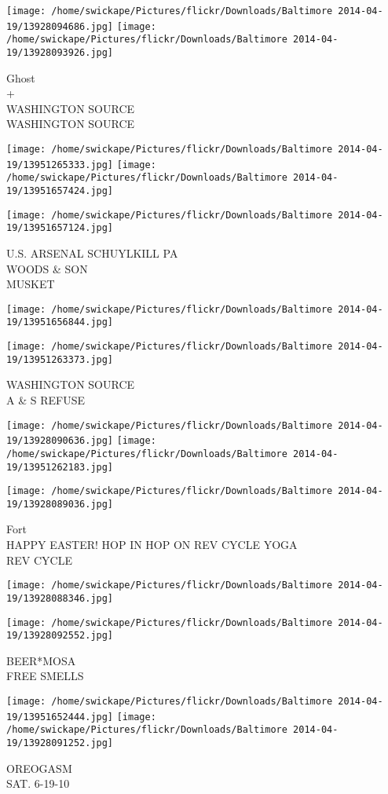 \documentclass[10pt,letterpaper]{article}
\begin{document}
\texttt{[image: /home/swickape/Pictures/flickr/Downloads/Baltimore 2014-04-19/13928094686.jpg]}
\texttt{[image: /home/swickape/Pictures/flickr/Downloads/Baltimore 2014-04-19/13928093926.jpg]}

Ghost\\
+\\
WASHINGTON SOURCE\\
WASHINGTON SOURCE
\pagebreak

\texttt{[image: /home/swickape/Pictures/flickr/Downloads/Baltimore 2014-04-19/13951265333.jpg]}
\texttt{[image: /home/swickape/Pictures/flickr/Downloads/Baltimore 2014-04-19/13951657424.jpg]}

\vspace{0.25in}
\texttt{[image: /home/swickape/Pictures/flickr/Downloads/Baltimore 2014-04-19/13951657124.jpg]}

U.S. ARSENAL SCHUYLKILL PA\\
WOODS \& SON\\
MUSKET
\pagebreak

\texttt{[image: /home/swickape/Pictures/flickr/Downloads/Baltimore 2014-04-19/13951656844.jpg]}

\vspace{0.25in}
\texttt{[image: /home/swickape/Pictures/flickr/Downloads/Baltimore 2014-04-19/13951263373.jpg]}

WASHINGTON SOURCE\\
A \& S REFUSE
\pagebreak

\texttt{[image: /home/swickape/Pictures/flickr/Downloads/Baltimore 2014-04-19/13928090636.jpg]}
\texttt{[image: /home/swickape/Pictures/flickr/Downloads/Baltimore 2014-04-19/13951262183.jpg]}

\vspace{0.25in}
\texttt{[image: /home/swickape/Pictures/flickr/Downloads/Baltimore 2014-04-19/13928089036.jpg]}

Fort\\
HAPPY EASTER! HOP IN HOP ON REV CYCLE YOGA\\
REV CYCLE
\pagebreak

\texttt{[image: /home/swickape/Pictures/flickr/Downloads/Baltimore 2014-04-19/13928088346.jpg]}

\vspace{0.25in}
\texttt{[image: /home/swickape/Pictures/flickr/Downloads/Baltimore 2014-04-19/13928092552.jpg]}

BEER*MOSA\\
FREE SMELLS
\pagebreak

\texttt{[image: /home/swickape/Pictures/flickr/Downloads/Baltimore 2014-04-19/13951652444.jpg]}
\texttt{[image: /home/swickape/Pictures/flickr/Downloads/Baltimore 2014-04-19/13928091252.jpg]}

OREOGASM\\
SAT. 6{-}19{-}10
\pagebreak
\end{document}
